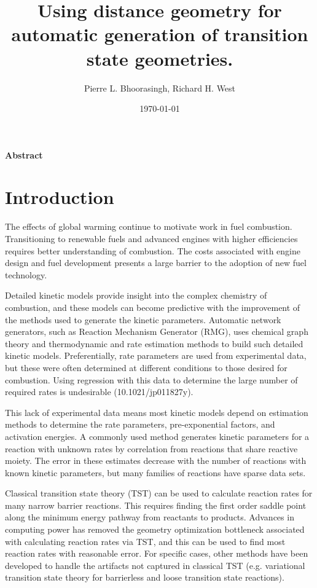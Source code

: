 \documentclass[11pt]{article}
\begin{document}
\title{Using distance geometry for automatic generation of transition state geometries.}
\author{Pierre L. Bhoorasingh, Richard H. West}
\date{\today}
\maketitle

\newpage
\paragraph{Abstract}

\newpage
\twocolumn
\section{Introduction}
The effects of global warming continue to motivate work in fuel combustion. Transitioning to renewable fuels and advanced engines with higher efficiencies requires better understanding of combustion. The costs associated with engine design and fuel development presents a large barrier to the adoption of new fuel technology.

Detailed kinetic models provide insight into the complex chemistry of combustion, and these models can become predictive with the improvement of the methods used to generate the kinetic parameters. Automatic network generators, such as Reaction Mechanism Generator (RMG), uses chemical graph theory and thermodynamic and rate estimation methods to build such detailed kinetic models. Preferentially, rate parameters are used from experimental data, but these were often  determined at different conditions to those desired for combustion. Using regression with this data to determine the large number of required rates is undesirable (10.1021/jp011827y).

This lack of experimental data means most kinetic models depend on estimation methods to determine the rate parameters, pre-exponential factors, and activation energies. A commonly used method generates kinetic parameters for a reaction with unknown rates by correlation from reactions that share reactive moiety. The error in these estimates decrease with the number of reactions with known kinetic parameters, but many families of reactions have sparse data sets.

Classical transition state theory (TST) can be used to calculate reaction rates for many narrow barrier reactions. This requires finding the first order saddle point along the minimum energy pathway from reactants to products. Advances in computing power has removed the geometry optimization bottleneck associated with calculating reaction rates via TST, and this can be used to find most reaction rates with reasonable error. For specific cases, other methods have been developed to handle the artifacts not captured in classical TST (e.g. variational transition state theory for barrierless and loose transition state reactions).
\end{document}
